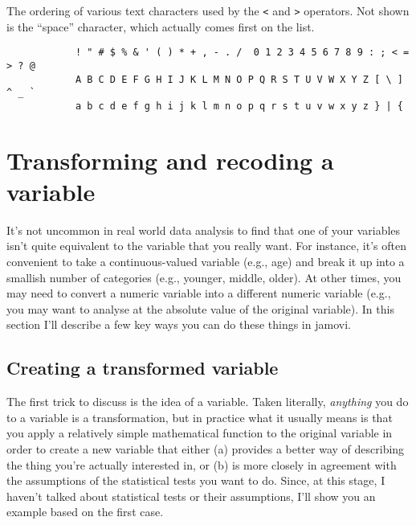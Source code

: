 \begin{table}
\begin{center}
\caption{The ordering of various text characters used by the \texttt{<} and \texttt{>} operators. Not shown is the ``space'' character, which actually comes first on the list.}\tabcapsep
\label{tab:asciiorder}
\begin{verbatim}
            ! " # $ % & ' ( ) * + , - . /  0 1 2 3 4 5 6 7 8 9 : ; < = > ? @ 
            A B C D E F G H I J K L M N O P Q R S T U V W X Y Z [ \ ]  ^ _ ` 
            a b c d e f g h i j k l m n o p q r s t u v w x y z } | {
\end{verbatim}
\end{center}
\end{table}


\section{Transforming and recoding a variable~\label{sec:transform}}

It's not uncommon in real world data analysis to find that one of your variables isn't quite equivalent to the variable that you really want. For instance, it's often convenient to take a continuous-valued variable (e.g., age) and break it up into a smallish number of categories (e.g., younger, middle, older). At other times, you may need to convert a numeric variable into a different numeric variable (e.g., you may want to analyse at the absolute value of the original variable). In this section I'll describe a few key ways you can do these things in jamovi. 

\subsection{Creating a transformed variable}

The first trick to discuss is the idea of  a variable. Taken literally, {\it anything} you do to a variable is a transformation, but in practice what it usually means is that you apply a relatively simple mathematical function to the original variable in order to create a new variable that either (a) provides a better way of describing the thing you're actually interested in, or (b) is more closely in agreement with the assumptions of the statistical tests you want to do.  Since, at this stage, I haven't talked about statistical tests or their assumptions, I'll show you an example based on the first case. 

